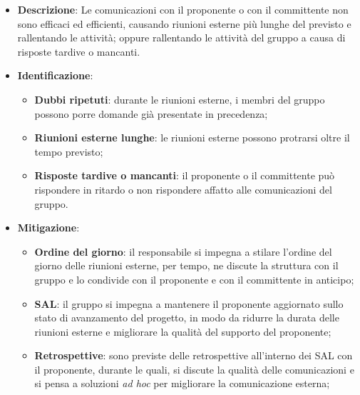 \label{risk:comunicazione esterna carente}
\begin{itemize}
	\item \textbf{Descrizione}:
	      Le comunicazioni con il proponente o con il committente non sono
	      efficaci ed efficienti, causando riunioni esterne più lunghe del
	      previsto e rallentando le attività; oppure rallentando le attività
	      del gruppo a causa di risposte tardive o mancanti.

	\item \textbf{Identificazione}:
	      \begin{itemize}
		      \item \textbf{Dubbi ripetuti}: durante le riunioni esterne, i
		            membri del gruppo possono porre domande già presentate in
		            precedenza;

		      \item \textbf{Riunioni esterne lunghe}: le riunioni esterne
		            possono protrarsi oltre il tempo previsto;

		      \item \textbf{Risposte tardive o mancanti}: il proponente o il
		            committente può rispondere in ritardo o non rispondere
		            affatto alle comunicazioni del gruppo.
	      \end{itemize}

	\item \textbf{Mitigazione}:
	      \begin{itemize}
		      \item \textbf{Ordine del giorno}: il responsabile si impegna a
		            stilare l'ordine del giorno delle riunioni esterne, per
		            tempo, ne discute la struttura con il gruppo e lo condivide
		            con il proponente e con il committente in anticipo;

		      \item \textbf{SAL}: il gruppo si impegna a mantenere il
		            proponente aggiornato sullo stato di avanzamento del
		            progetto, in modo da ridurre la durata delle riunioni
		            esterne e migliorare la qualità del supporto del proponente;

		      \item \textbf{Retrospettive}: sono previste delle retrospettive
		            all'interno dei SAL con il proponente, durante le quali, si
		            discute la qualità delle comunicazioni e si pensa a
		            soluzioni \textit{ad hoc} per migliorare la comunicazione
		            esterna;


\end{itemize}
\end{itemize}
